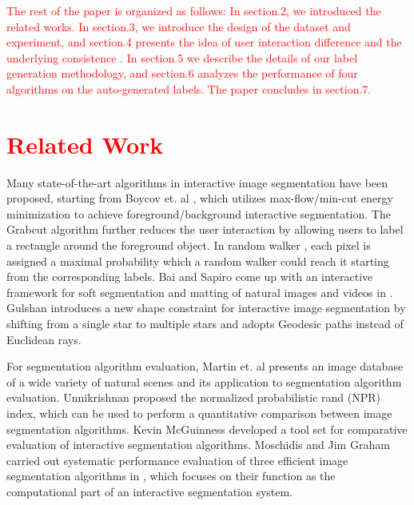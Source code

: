 \documentclass[runningheads,a4paper]{llncs}
\begin{document}
\textcolor{red}{The rest of the paper is organized as follows: In section.2, we introduced the related works. In section.3, we introduce the design of the dataset and experiment, and section.4 presents the idea of user interaction difference and the underlying consistence . In section.5 we describe the details of our label generation methodology, and section.6 analyzes the performance of four algorithms on the auto-generated labels. The paper concludes in section.7.}

\section{\textcolor{red}{Related Work}}

Many state-of-the-art algorithms in interactive image segmentation have been proposed, starting from Boycov et. al \cite{boykov2001interactive}, which utilizes max-flow/min-cut energy minimization to achieve foreground/background interactive segmentation. The Grabcut algorithm\cite{rother2004grabcut} further reduces the user interaction by allowing users to label a rectangle around the foreground object. In random walker \cite{grady2006random}, each pixel is assigned a maximal probability which a random walker could reach it starting from the corresponding labels. Bai and Sapiro come up with an interactive framework for soft segmentation and matting of natural images and videos in \cite{bai2007geodesic}. Gulshan\cite{gulshan2010geodesic} introduces a new shape constraint for interactive image segmentation by shifting from a single star to multiple stars and adopts Geodesic paths instead of Euclidean rays.

For segmentation algorithm evaluation, Martin et. al  \cite{martin2001database} presents an image database of a wide variety of natural scenes and its application to segmentation algorithm evaluation.  Unnikrishnan \cite{unnikrishnan2007toward} proposed the normalized probabilistic rand (NPR) index, which can be used to perform a quantitative comparison between image segmentation algorithms. Kevin McGuinness \cite{mcguinness2010comparative} developed a tool set for comparative evaluation of interactive segmentation algorithms. Moschidis and Jim Graham carried out systematic performance evaluation of three efficient image segmentation algorithms in \cite{moschidis2010systematic}, which focuses on their function as the computational part of an interactive segmentation system.
\end{document}
